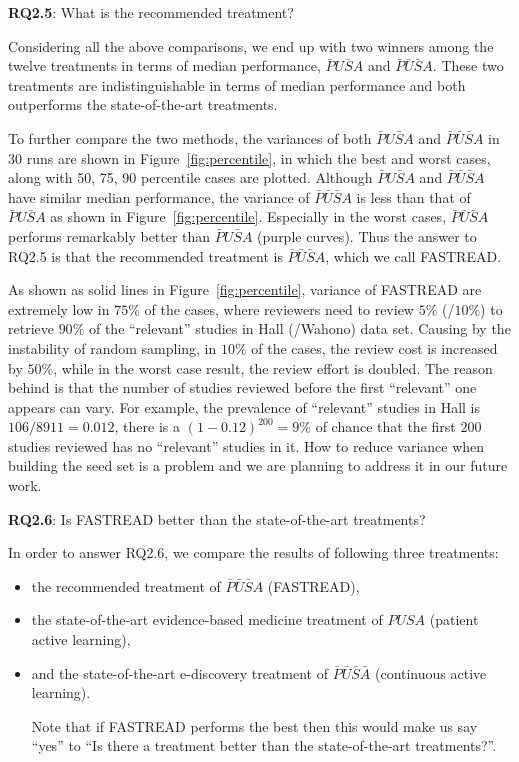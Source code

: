 \documentclass[final,twocolumn,5p]{elsarticle}
\theoremstyle{break}
\begin{document}
\textbf{RQ2.5}: What is the recommended treatment?

Considering all the above comparisons, we end up with two winners among the twelve treatments in terms of median performance, $\bar{P}U\bar{S}A$ and $\bar{P}\bar{U}\bar{S}A$. These two treatments are indistinguishable in terms of median performance and both outperforms the state-of-the-art treatments.

To further compare the two methods, the variances of both $\bar{P}U\bar{S}A$ and $\bar{P}\bar{U}\bar{S}A$ in $30$ runs are shown in Figure~\ref{fig:percentile}, in which the best and worst cases, along with 50, 75, 90 percentile cases are plotted. Although $\bar{P}U\bar{S}A$ and $\bar{P}\bar{U}\bar{S}A$ have similar median performance, the variance of $\bar{P}\bar{U}\bar{S}A$ is less than that of $\bar{P}U\bar{S}A$ as shown in Figure~\ref{fig:percentile}. Especially in the worst cases, $\bar{P}\bar{U}\bar{S}A$ performs remarkably better than $\bar{P}U\bar{S}A$ (purple curves). Thus the answer to RQ2.5 is that the recommended treatment is $\bar{P}\bar{U}\bar{S}A$, which we call FASTREAD.

As shown as solid lines in Figure~\ref{fig:percentile}, variance of FASTREAD are extremely low in $75\%$ of the cases, where reviewers need to review $5\%$ (/$10\%$) to retrieve $90\%$ of the ``relevant'' studies in Hall (/Wahono) data set. Causing by the instability of random sampling, in $10\%$ of the cases, the review cost is increased by $50\%$, while in the worst case result, the review effort is doubled. The reason behind is that the number of studies reviewed before the first ``relevant'' one appears can vary. For example, the prevalence of ``relevant'' studies in Hall is $106/8911=0.012$, there is a $(1-0.12)^{200}=9\%$ of chance that the first $200$ studies reviewed has no ``relevant'' studies in it. How to reduce variance when building the seed set is a problem and we are planning to address it in our future work.



\textbf{RQ2.6}: Is FASTREAD better than the state-of-the-art treatments?

In order to answer RQ2.6, we compare the results of following three treatments:

\begin{itemize}
\item the recommended treatment of $\bar{P}\bar{U}\bar{S}A$ (FASTREAD),
\item the state-of-the-art evidence-based medicine treatment of $PUSA$ (patient active learning),
\item and the state-of-the-art e-discovery treatment of $\bar{P}\bar{U}\bar{S}\bar{A}$ (continuous active learning). 

Note that if FASTREAD performs the best then this would make us say ``yes'' to ``Is there a treatment better than the state-of-the-art treatments?''.
\end{itemize}
\end{document}
